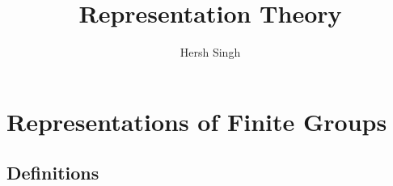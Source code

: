 

\usepackage[
    backend=bibtex,
    style=alphabetic,
    sortlocale=en_US,
    natbib=true,
    url=false, 
    doi=true,
    eprint=false
]{biblatex}


\usepackage[vcentermath]{youngtab} %
\setcounter{secnumdepth}{1}

\DeclareMathOperator{\Sym}{Sym} %
\DeclareMathOperator{\Alt}{\Lambda} %
\DeclareMathOperator{\sgn}{sgn} %
\DeclareMathOperator{\triv}{triv} %
\DeclareMathOperator{\std}{std} %
\DeclareMathOperator{\Ind}{Ind} %

\DeclareMathOperator{\id}{id}

\DeclareMathOperator{\gr}{gr}

\DeclareMathOperator{\ad}{ad}

\newcommand{\injects}{\hookrightarrow}
\newcommand{\onto}{\twoheadrightarrow}
\newcommand{\germs}{\mathcal E}
\newcommand{\defn}[1]{\textbf{#1}}
\newcommand\Weyl{\mathcal{W}}

\newcommand{\Lie}[1]{\mathfrak{\lowercase{#1}}}
\newcommand{\LieGL}{\mathfrak{gl}}
\newcommand{\LieA}{\mathfrak{a}}
\newcommand{\LieB}{\mathfrak{b}}
\newcommand{\LieG}{\mathfrak{g}}
\newcommand{\LieH}{\mathfrak{h}}
\newcommand{\LieSL}{\mathfrak{sl}}

\DeclareMathOperator\Rad{Rad}


\DeclareMathOperator\height{ht}


\title{Representation Theory}
\author{Hersh Singh}

\maketitle

\tableofcontents

\chapter{Representations of Finite Groups}
\section{Definitions}
\label{sec:definitions}


